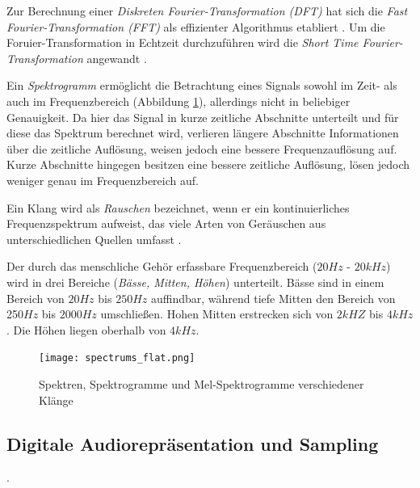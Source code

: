 \documentclass[
  a4paper,  %
  twoside,  %
  bibliography=totoc,
  headsepline,
  cleardoublepage=empty,
  parskip=half,
  draft=false
]{scrbook}
\begin{document}
Zur Berechnung einer \emph{Diskreten Fourier-Transformation (DFT)} hat sich die \emph{Fast Fourier-Transformation (FFT)} als effizienter Algorithmus etabliert \cite{heideman_gauss_1985}. Um die Foruier-Transformation in Echtzeit durchzuführen wird die \emph{Short Time Fourier-Transformation} angewandt \cite{thyagarajan_introduction_2019}. 

Ein \emph{Spektrogramm} ermöglicht die Betrachtung eines Signals sowohl im Zeit- als auch im Frequenzbereich (Abbildung \ref{fig:spectro}), allerdings nicht in beliebiger Genauigkeit. Da hier das Signal in kurze zeitliche Abschnitte unterteilt und für diese das Spektrum berechnet wird, verlieren längere Abschnitte Informationen über die zeitliche Auflösung, weisen jedoch eine bessere Frequenzauflösung auf. Kurze Abschnitte hingegen besitzen eine bessere zeitliche Auflösung, lösen jedoch weniger genau im Frequenzbereich auf. \cite{raffaseder_audiodesign_2010}

Ein Klang wird als \emph{Rauschen} bezeichnet, wenn er ein kontinuierliches Frequenzspektrum aufweist, das viele Arten von Geräuschen aus unterschiedlichen Quellen umfasst
\cite{tsuji_physics_2021}. 

Der durch das menschliche Gehör erfassbare Frequenzbereich ($20 Hz$ -  $20kHz$) wird in drei Bereiche (\emph{Bässe, Mitten, Höhen}) unterteilt. Bässe sind in einem Bereich von $20Hz$ bis $250Hz$ auffindbar, während tiefe Mitten den Bereich von 250$Hz$ bis $2000Hz$ umschließen. Hohen Mitten erstrecken sich von $2kHZ$ bis $4kHz$. Die Höhen liegen oberhalb von $4kHz$. \cite{raffaseder_audiodesign_2010}

\begin{figure}
  \centering
  \texttt{[image: spectrums\_flat.png]}
  \caption[Fourier Reihe]{Spektren, Spektrogramme und Mel-Spektrogramme verschiedener Klänge}
  \label{fig:spectro}
\end{figure}


\subsection{Digitale Audiorepräsentation und Sampling}. 
\end{document}
